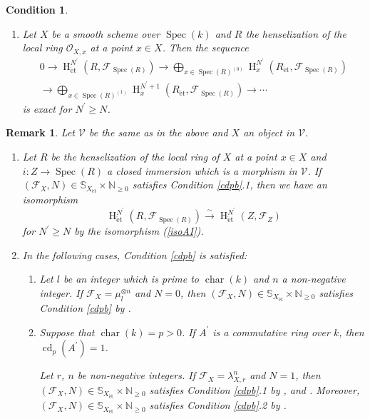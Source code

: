 \documentclass{article}
\newtheorem{cond}[thm]{\indent \sc Condition}
\newtheorem{rem}[thm]{\indent \sc Remark}
\newcommand{\spec}{\operatorname{Spec}}
\newcommand{\et}{\mathrm{\acute{e}t}}
\newcommand{\HO}{\operatorname{H}}
\begin{document}
\begin{cond}
\begin{enumerate}
\begin{enumerate}
$i^{*}$.
%
\end{enumerate}
%
\item
Let $X$ be a smooth scheme over $\spec(k)$ and 
$R$ the henselization of 
the local ring $\mathcal{O}_{X, x}$ at a point $x\in X$.
Then the sequence
%
\begin{align*}
0\to   
\HO^{N^{\prime}}_{\et}(R,
\mathcal{F}_{\spec(R)})
\to 
\bigoplus_{x\in\spec(R)^{(0)}}
\HO^{N^{\prime}}_{x}(
R_{\et},
\mathcal{F}_{\spec(R)}
)
\\
\to
\bigoplus_{x\in\spec(R)^{(1)}}
\HO^{N^{\prime}+1}_{x}(
R_{\et},
\mathcal{F}_{\spec(R)}
)
\to\cdots
\end{align*}
%
is exact for $N^{\prime}\geq N$.
\end{enumerate}
%
\end{cond}
%

%
\begin{rem}\upshape\label{ExaCond}
Let $\mathcal{V}$ be the same as in the above
and $X$ an object in $\mathcal{V}$.
%
\begin{enumerate}
%
\item 
Let $R$ be the henselization of the local ring of
$X$
at a point $x\in X$ and
$i: Z\to\spec(R)$
a closed immersion which is 
a morphism in $\mathcal{V}$.
If $(\mathcal{F}_{X}, N)\in\mathbb{S}_{X_{\et}}\times \mathbb{N}_{\geq 0}$
satisfies Condition \ref{cdpb}.1, 
then
we have an isomorphism
%
\begin{equation*}
\HO^{N^{\prime}}_{\et}(
R, \mathcal{F}_{\spec(R)}
)
\xrightarrow{\sim}
\HO^{N^{\prime}}_{\et}(
Z,
\mathcal{F}_{Z}
)
\end{equation*}
%
for $N^{\prime}\geq N$ by the isomorphism (\ref{isoAI}).
%
\item
In the following cases, Condition \ref{cdpb} is satisfied:
%
\begin{enumerate}
%
\item[(i)] 
Let $l$ be an integer which is prime to $\operatorname{char}(k)$
and $n$ a non-negative integer. 
If
$\mathcal{F}_{X}=\mu_{l}^{\otimes n}$ and  $N=0$, then $(\mathcal{F}_{X}, N)\in \mathbb{S}_{X_{\et}}\times \mathbb{N}_{\geq 0}$ 
satisfies Condition \ref{cdpb}
by \cite[Corollary 2.2.2]{C-H-K}.
%
\item[(ii)]
Suppose that $\operatorname{char}(k)=p>0$.
If $A^{\prime}$ is a commutative ring over $k$,
then $\operatorname{cd}_{p}(A^{\prime})=1$.

Let $r$, $n$ be non-negative integers. 
If $\mathcal{F}_{X}=\lambda_{X, r}^{n}$ and $N=1$, then
$(\mathcal{F}_{X}, N)\in \mathbb{S}_{X_{\et}}\times \mathbb{N}_{\geq 0}$ 
satisfies Condition \ref{cdpb}.1 
by \cite[p.732, Theorem 3.5.1]{SaL},
\cite[p.734, Corollary 3.5.3]{SaL} and \cite[p.30, Theorem 2.8]{Sak4}.
Moreover,
$(\mathcal{F}_{X}, N)\in \mathbb{S}_{X_{\et}}\times \mathbb{N}_{\geq 0}$ 
satisfies Condition \ref{cdpb}.2 
by \cite[p.600, Theorem 4.1]{Sh}.
%
\end{enumerate}
%
\end{enumerate}
\end{rem}
%
\end{document}
